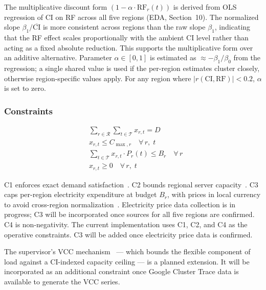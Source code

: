 The multiplicative discount form $(1 - \alpha \cdot \mathrm{RF}_r(t))$ is derived from OLS regression of CI on RF across all five regions (EDA, Section~10). The normalized slope $\beta_1/\overline{\mathrm{CI}}$ is more consistent across regions than the raw slope $\beta_1$, indicating that the RF effect scales proportionally with the ambient CI level rather than acting as a fixed absolute reduction. This supports the multiplicative form over an additive alternative. Parameter $\alpha \in [0, 1]$ is estimated as $\approx -\beta_1/\beta_0$ from the regression; a single shared value is used if the per-region estimates cluster closely, otherwise region-specific values apply. For any region where $|r(\mathrm{CI}, \mathrm{RF})| < 0.2$, $\alpha$ is set to zero.

\subsubsection*{Constraints}

\begin{align}
  &\sum_{r \in \mathcal{R}} \sum_{t \in \mathcal{T}} x_{r,t} = D
  \tag{C1} \label{eq:c1} \\[4pt]
  &x_{r,t} \leq C_{\max,r} \quad \forall\, r,\; t
  \tag{C2} \label{eq:c2} \\[4pt]
  &\sum_{t \in \mathcal{T}} x_{r,t} \cdot P_r(t) \leq B_r \quad \forall\, r
  \tag{C3} \label{eq:c3} \\[4pt]
  &x_{r,t} \geq 0 \quad \forall\, r,\; t
  \tag{C4} \label{eq:c4}
\end{align}

C1 enforces exact demand satisfaction~\cite{liu2012}.
C2 bounds regional server capacity~\cite{liu2012}.
C3 caps per-region electricity expenditure at budget $B_r$, with prices in local currency to avoid cross-region normalization~\cite{hao2024joint}. Electricity price data collection is in progress; C3 will be incorporated once sources for all five regions are confirmed.
C4 is non-negativity.
The current implementation uses C1, C2, and C4 as the operative constraints. C3 will be added once electricity price data is confirmed.

The supervisor's VCC mechanism~\cite{colangelo2025} — which bounds the flexible component of load against a CI-indexed capacity ceiling — is a planned extension. It will be incorporated as an additional constraint once Google Cluster Trace data is available to generate the VCC series.

